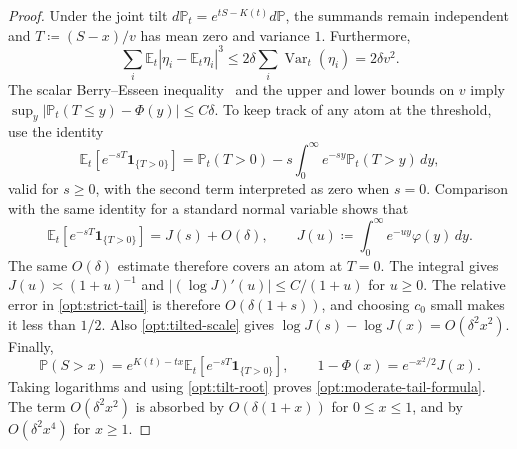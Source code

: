 \documentclass[11pt,letterpaper]{article}
\theoremstyle{remark}
\newcommand{\E}{\mathbb E}
\newcommand{\Pp}{\mathbb P}
\newcommand{\Var}{\operatorname{Var}}
\newcommand{\ind}{\mathbf 1}
\begin{document}
\begin{proof}
Under the joint tilt
\(d\Pp_t=e^{tS-K(t)}d\Pp\), the summands remain independent and
\(T\coloneqq(S-x)/v\) has mean zero and variance \(1\). Furthermore,
\[
 \sum_i\E_t|\eta_i-\E_t\eta_i|^3
 \le2\delta\sum_i\Var_t(\eta_i)=2\delta v^2.
\]
The scalar Berry--Esseen inequality~\cite{Berry1941} and the upper and lower bounds on \(v\) imply
\(\sup_y|\Pp_t(T\le y)-\Phi(y)|\le C\delta\).
To keep track of any atom at the threshold, use the identity
\[
 \E_t[e^{-sT}\ind_{\{T>0\}}]
 =\Pp_t(T>0)-s\int_0^\infty e^{-sy}\Pp_t(T>y)\,dy,
\]
valid for \(s\ge0\), with the second term interpreted as zero when
\(s=0\). Comparison with
the same identity for a standard normal variable shows that
\begin{equation}
 \E_t[e^{-sT}\ind_{\{T>0\}}]=J(s)+O(\delta),\qquad
 J(u)\coloneqq\int_0^\infty e^{-uy}\varphi(y)\,dy.
 \label{opt:strict-tail}
\end{equation}
The same \(O(\delta)\) estimate therefore covers an atom at \(T=0\).
The integral gives \(J(u)\asymp(1+u)^{-1}\) and
\(|(\log J)'(u)|\le C/(1+u)\) for \(u\ge0\).
The relative error in \eqref{opt:strict-tail} is therefore
\(O(\delta(1+s))\), and choosing \({c_0}\) small makes it less than \(1/2\).
Also \eqref{opt:tilted-scale} gives
\(\log J(s)-\log J(x)=O(\delta^2x^2)\).
Finally,
\[
 \Pp(S>x)=e^{K(t)-tx}\E_t[e^{-sT}\ind_{\{T>0\}}],\qquad
 1-\Phi(x)=e^{-x^2/2}J(x).
\]
Taking logarithms and using \eqref{opt:tilt-root} proves
\eqref{opt:moderate-tail-formula}. The term \(O(\delta^2x^2)\) is
absorbed by \(O(\delta(1+x))\) for \(0\le x\le1\), and by
\(O(\delta^2x^4)\) for \(x\ge1\).
\end{proof}
\end{document}
